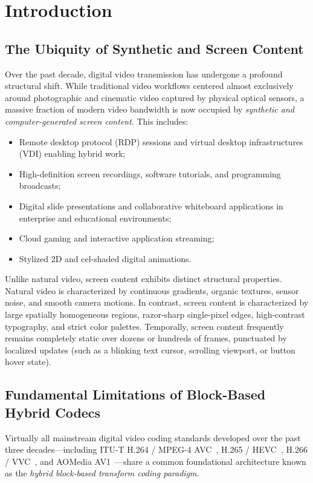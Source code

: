\chapter{Introduction}
\label{chap:intro}

\section{The Ubiquity of Synthetic and Screen Content}
Over the past decade, digital video transmission has undergone a profound structural shift. While traditional video workflows centered almost exclusively around photographic and cinematic video captured by physical optical sensors, a massive fraction of modern video bandwidth is now occupied by \textit{synthetic and computer-generated screen content}. This includes:
\begin{itemize}
    \item Remote desktop protocol (RDP) sessions and virtual desktop infrastructures (VDI) enabling hybrid work;
    \item High-definition screen recordings, software tutorials, and programming broadcasts;
    \item Digital slide presentations and collaborative whiteboard applications in enterprise and educational environments;
    \item Cloud gaming and interactive application streaming;
    \item Stylized 2D and cel-shaded digital animations.
\end{itemize}

Unlike natural video, screen content exhibits distinct structural properties. Natural video is characterized by continuous gradients, organic textures, sensor noise, and smooth camera motions. In contrast, screen content is characterized by large spatially homogeneous regions, razor-sharp single-pixel edges, high-contrast typography, and strict color palettes. Temporally, screen content frequently remains completely static over dozens or hundreds of frames, punctuated by localized updates (such as a blinking text cursor, scrolling viewport, or button hover state).

\section{Fundamental Limitations of Block-Based Hybrid Codecs}
Virtually all mainstream digital video coding standards developed over the past three decades---including ITU-T H.264 / MPEG-4 AVC~\cite{wiegand2003overview}, H.265 / HEVC~\cite{sullivan2012overview}, H.266 / VVC~\cite{bross2021overview}, and AOMedia AV1~\cite{chen2020overview}---share a common foundational architecture known as the \textit{hybrid block-based transform coding paradigm}.

